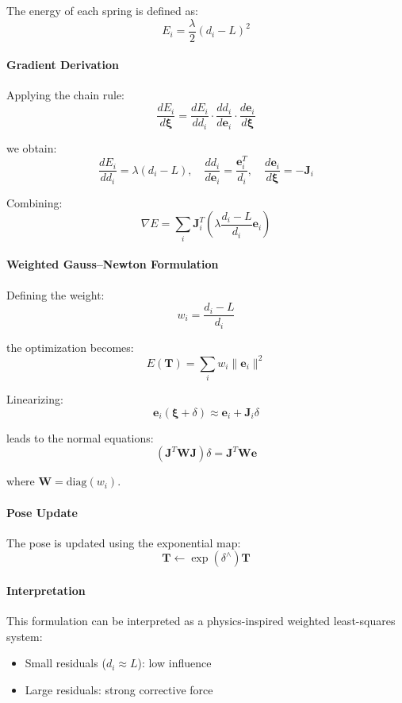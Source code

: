 The energy of each spring is defined as:
\[
E_i = \frac{\lambda}{2}(d_i - L)^2
\]

\paragraph{Gradient Derivation}

Applying the chain rule:
\[
\frac{dE_i}{d\boldsymbol{\xi}} =
\frac{dE_i}{dd_i}
\cdot
\frac{dd_i}{d\mathbf{e}_i}
\cdot
\frac{d\mathbf{e}_i}{d\boldsymbol{\xi}}
\]

we obtain:
\[
\frac{dE_i}{dd_i} = \lambda(d_i - L), \quad
\frac{dd_i}{d\mathbf{e}_i} = \frac{\mathbf{e}_i^T}{d_i}, \quad
\frac{d\mathbf{e}_i}{d\boldsymbol{\xi}} = -\mathbf{J}_i
\]

Combining:
\[
\nabla E =
\sum_i \mathbf{J}_i^T
\left(
\lambda \frac{d_i - L}{d_i} \mathbf{e}_i
\right)
\]

\paragraph{Weighted Gauss--Newton Formulation}

Defining the weight:
\[
w_i = \frac{d_i - L}{d_i}
\]

the optimization becomes:
\[
E(\mathbf{T}) = \sum_i w_i \|\mathbf{e}_i\|^2
\]

Linearizing:
\[
\mathbf{e}_i(\boldsymbol{\xi} + \delta)
\approx
\mathbf{e}_i + \mathbf{J}_i \delta
\]

leads to the normal equations:
\[
(\mathbf{J}^T \mathbf{W} \mathbf{J}) \delta =
\mathbf{J}^T \mathbf{W} \mathbf{e}
\]

where $\mathbf{W} = \mathrm{diag}(w_i)$.

\paragraph{Pose Update}

The pose is updated using the exponential map:
\[
\mathbf{T} \leftarrow \exp(\delta^\wedge)\mathbf{T}
\]

\paragraph{Interpretation}

This formulation can be interpreted as a physics-inspired weighted least-squares system:
\begin{itemize}
    \item Small residuals ($d_i \approx L$): low influence
    \item Large residuals: strong corrective force
\end{itemize}

